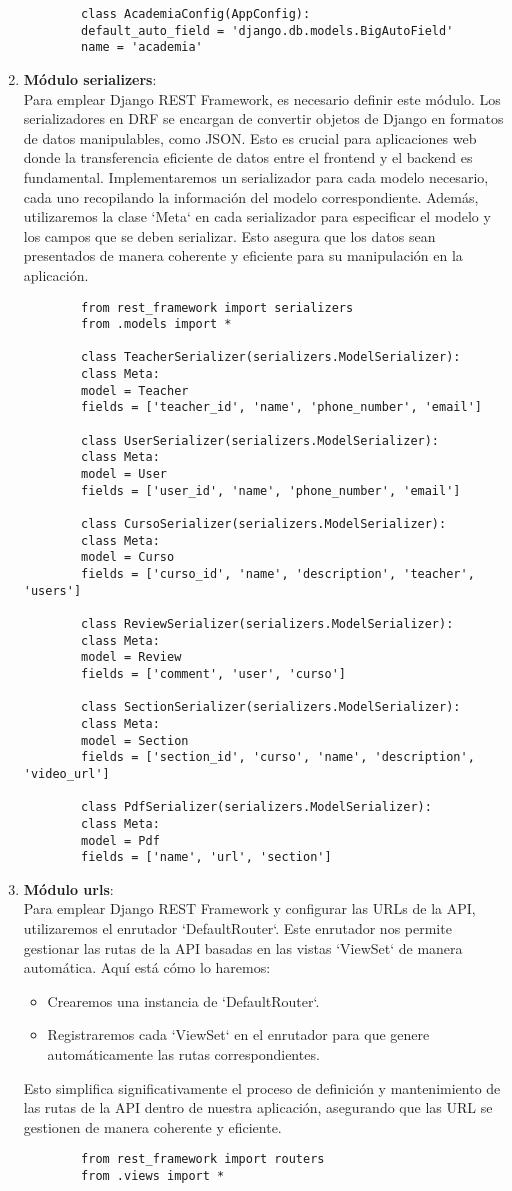 \begin{enumerate}
\begin{verbatim}
		class AcademiaConfig(AppConfig):
		default_auto_field = 'django.db.models.BigAutoField'
		name = 'academia'	
	\end{verbatim}
	\item \textbf{Módulo serializers}: \\
	Para emplear Django REST Framework, es necesario definir este módulo. Los serializadores en DRF se encargan de convertir objetos de Django en formatos de datos manipulables, como JSON. Esto es crucial para aplicaciones web donde la transferencia eficiente de datos entre el frontend y el backend es fundamental. Implementaremos un serializador para cada modelo necesario, cada uno recopilando la información del modelo correspondiente. Además, utilizaremos la clase `Meta` en cada serializador para especificar el modelo y los campos que se deben serializar. Esto asegura que los datos sean presentados de manera coherente y eficiente para su manipulación en la aplicación.
	\begin{verbatim}
		from rest_framework import serializers
		from .models import *
		
		class TeacherSerializer(serializers.ModelSerializer):
		class Meta:
		model = Teacher
		fields = ['teacher_id', 'name', 'phone_number', 'email']
		
		class UserSerializer(serializers.ModelSerializer):
		class Meta:
		model = User
		fields = ['user_id', 'name', 'phone_number', 'email']
		
		class CursoSerializer(serializers.ModelSerializer):
		class Meta:
		model = Curso
		fields = ['curso_id', 'name', 'description', 'teacher', 'users']
		
		class ReviewSerializer(serializers.ModelSerializer):
		class Meta:
		model = Review
		fields = ['comment', 'user', 'curso']
		
		class SectionSerializer(serializers.ModelSerializer):
		class Meta:
		model = Section
		fields = ['section_id', 'curso', 'name', 'description', 'video_url']
		
		class PdfSerializer(serializers.ModelSerializer):
		class Meta:
		model = Pdf
		fields = ['name', 'url', 'section']	
	\end{verbatim}
	\item \textbf{Módulo urls}: \\
	Para emplear Django REST Framework y configurar las URLs de la API, utilizaremos el enrutador `DefaultRouter`. Este enrutador nos permite gestionar las rutas de la API basadas en las vistas `ViewSet` de manera automática. Aquí está cómo lo haremos:
	\begin{itemize}
		\item Crearemos una instancia de `DefaultRouter`.
		\item Registraremos cada `ViewSet` en el enrutador para que genere automáticamente las rutas correspondientes.
	\end{itemize}
	Esto simplifica significativamente el proceso de definición y mantenimiento de las rutas de la API dentro de nuestra aplicación, asegurando que las URL se gestionen de manera coherente y eficiente.
	\begin{verbatim}
		from rest_framework import routers
		from .views import *
		

\end{verbatim}
\end{enumerate}
